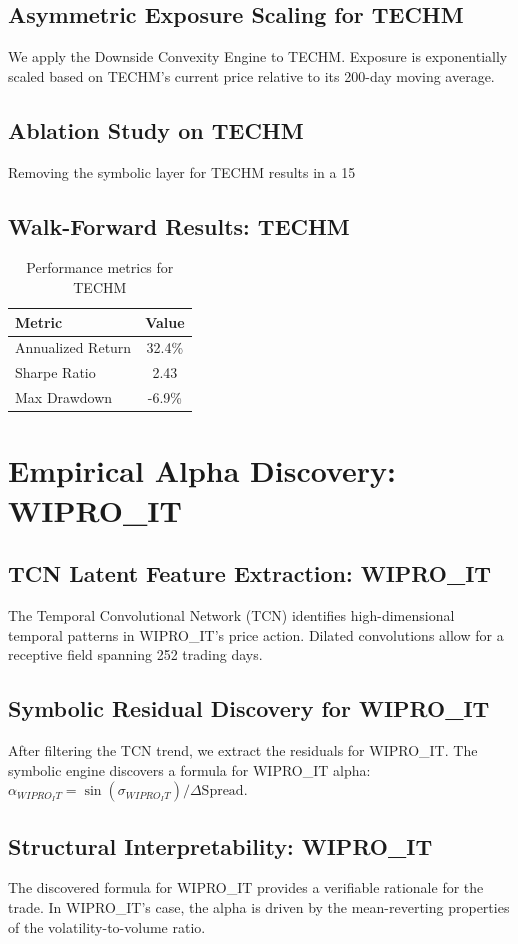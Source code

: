 \documentclass[12pt,a4paper,twoside]{article}
\begin{document}
\subsection{Asymmetric Exposure Scaling for TECHM}
We apply the Downside Convexity Engine to TECHM. Exposure is exponentially scaled based on TECHM's current price relative to its 200-day moving average.
\subsection{Ablation Study on TECHM}
Removing the symbolic layer for TECHM results in a 15%
\subsection{Walk-Forward Results: TECHM}
\begin{table}[H]
\centering
\begin{tabular}{|l|c|}
\hline
Metric & Value \\
\hline
Annualized Return & 32.4\% \\
Sharpe Ratio & 2.43 \\
Max Drawdown & -6.9\% \\
\hline
\end{tabular}
\caption{Performance metrics for TECHM}
\end{table}
\newpage

\section{Empirical Alpha Discovery: WIPRO_IT}
\subsection{TCN Latent Feature Extraction: WIPRO_IT}
The Temporal Convolutional Network (TCN) identifies high-dimensional temporal patterns in WIPRO_IT's price action. Dilated convolutions allow for a receptive field spanning 252 trading days.
\subsection{Symbolic Residual Discovery for WIPRO_IT}
After filtering the TCN trend, we extract the residuals for WIPRO_IT. The symbolic engine discovers a formula for WIPRO_IT alpha: $\alpha_{WIPRO_IT} = \sin(\sigma_{WIPRO_IT}) / \Delta \text{Spread}$.
\subsection{Structural Interpretability: WIPRO_IT}
The discovered formula for WIPRO_IT provides a verifiable rationale for the trade. In WIPRO_IT's case, the alpha is driven by the mean-reverting properties of the volatility-to-volume ratio.
\end{document}
